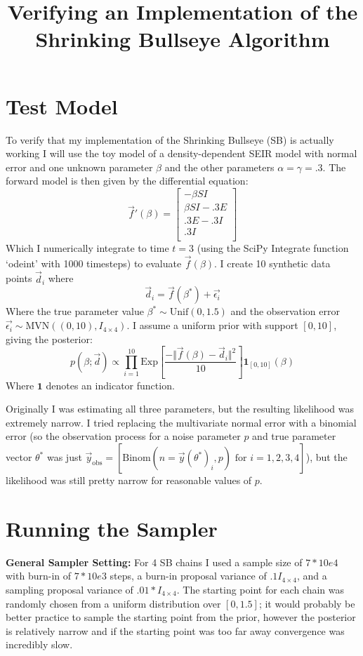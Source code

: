 \documentclass[12pt,a4paper]{article}
\title{Verifying an Implementation of the Shrinking Bullseye Algorithm}
\begin{document}
\maketitle
\section{Test Model}
To verify that my implementation of the Shrinking Bullseye (SB) is actually working I will use the toy model of a density-dependent SEIR model with normal error and one unknown parameter $\beta$ and the other parameters $\alpha = \gamma = .3$.  The forward model is then given by the differential equation:
\begin{equation}
\vec{f}'(\beta) =
\left[
\begin{array}{c}
- \beta S I\\
\beta S I - .3 E\\
.3 E - .3 I\\
.3 I\\
\end{array}
\right]
\end{equation}
Which I numerically integrate to time $t =3$ (using the SciPy Integrate function `odeint' with 1000 timesteps) to evaluate $\vec{f}(\beta)$.  I create 10 synthetic data points $\vec{d}_i$ where
\[
\vec{d}_i = \vec{f}(\beta^*) + \vec{\epsilon_i}
\]
Where the true parameter value $\beta^* \sim \text{Unif}(0,1.5)$ and the observation error $\vec{\epsilon_i} \sim \text{MVN} \left( (0,10), I_{4 \times 4} \right)$.  I assume a uniform prior with support $[0,10]$, giving the posterior:
\begin{equation}
p(\beta; \vec{d}) \propto \prod\limits_{i=1}^{10} \text{Exp} \left[\frac{-\Vert \vec{f}(\beta) - \vec{d}_i \Vert^2}{10} \right] \mathbf{1}_{[0,10]}(\beta)
\end{equation}
Where $\mathbf{1}$ denotes an indicator function.

Originally I was estimating all three parameters, but the resulting likelihood was extremely narrow.  I tried replacing the multivariate normal error with a binomial error (so the observation process for a noise parameter $p$ and true parameter vector $\theta^*$ was just $\vec{y}_{\text{obs}} = [\text{Binom}(n = \vec{y}(\theta^*)_i,p) \text{ for } i=1,2,3,4]$), but the likelihood was still pretty narrow for reasonable values of $p$.

\section{Running the Sampler}
\textbf{General Sampler Setting: } For 4 SB chains I used a sample size of $7*10e4$ with burn-in of $7*10e3$ steps, a burn-in proposal variance of $.1 I_{4 \times 4}$, and a sampling proposal variance of $.01*I_{4 \times 4}$.  The starting point for each chain was randomly chosen from a uniform distribution over $[0,1.5]$; it would probably be better practice to sample the starting point from the prior, however the posterior is relatively narrow and if the starting point was too far away convergence was incredibly slow.
\end{document}
